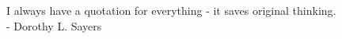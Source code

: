 \vspace*{10cm}
\centering

I always have a quotation for everything - it saves original thinking. \\ - Dorothy L. Sayers


